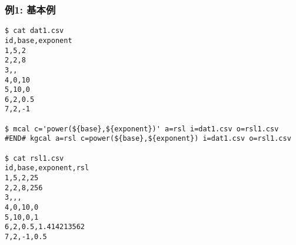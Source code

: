 
\subsubsection*{例1: 基本例}


\begin{Verbatim}[baselinestretch=0.7,frame=single]
$ cat dat1.csv
id,base,exponent
1,5,2
2,2,8
3,,
4,0,10
5,10,0
6,2,0.5
7,2,-1

$ mcal c='power(${base},${exponent})' a=rsl i=dat1.csv o=rsl1.csv
#END# kgcal a=rsl c=power(${base},${exponent}) i=dat1.csv o=rsl1.csv

$ cat rsl1.csv
id,base,exponent,rsl
1,5,2,25
2,2,8,256
3,,,
4,0,10,0
5,10,0,1
6,2,0.5,1.414213562
7,2,-1,0.5
\end{Verbatim}
